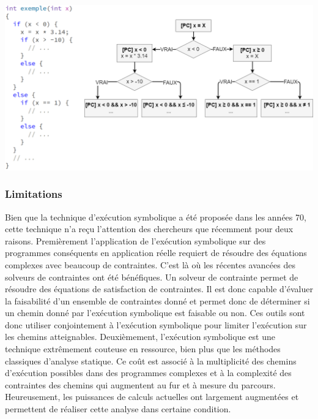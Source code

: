 \begin{center}
    \includegraphics[scale=0.4]{../ressources/images/dynamic_execution_example.png}
    \label{symbolic-execution-example1}
\end{center}


\subsubsection*{Limitations}
Bien que la technique d'exécution symbolique a été proposée dans les années 70\cite{symbolic-execution-by-king}, cette technique n'a reçu l'attention des chercheurs que récemment pour deux raisons. 
Premièrement l'application de l'exécution symbolique sur des programmes conséquents en application réelle requiert de résoudre des équations complexes avec beaucoup de contraintes. C'est là où les récentes avancées des solveurs de contraintes ont été bénéfiques. Un solveur de contrainte permet de résoudre des équations de satisfaction de contraintes. Il est donc capable d'évaluer la faisabilité d'un ensemble de contraintes donné et permet donc de déterminer si un chemin donné par l'exécution symbolique est faisable ou non. Ces outils sont donc utiliser conjointement à l'exécution symbolique pour limiter l'exécution sur les chemins atteignables.
Deuxièmement, l'exécution symbolique est une technique extrêmement couteuse en ressource, bien plus que les méthodes classiques d'analyse statique. Ce coût est associé à la multiplicité des chemins d'exécution possibles dans des programmes complexes et à la complexité des contraintes des chemins qui augmentent au fur et à mesure du parcours. Heureusement, les puissances de calculs actuelles ont largement augmentées et permettent de réaliser cette analyse dans certaine condition.

